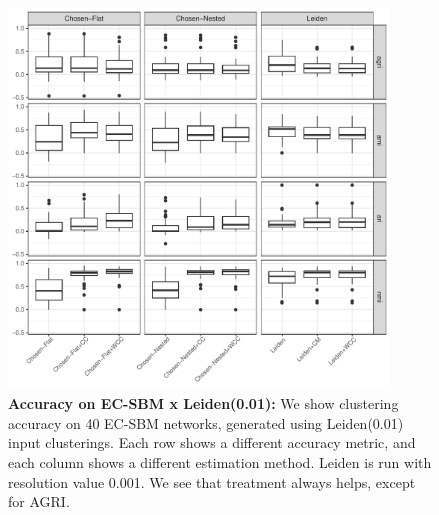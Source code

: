 \documentclass[aps,pre,superscriptaddress]{article}
\begin{document}
\begin{figure}[!htpb]
    \centering
    \includegraphics[width=0.9\textwidth]{figures/estimated_accuracy_leiden01.pdf}
    \caption[]{\textbf{Accuracy on EC-SBM x Leiden(0.01):} We show clustering accuracy on 40 EC-SBM networks, generated using Leiden(0.01) input clusterings. Each row shows a different accuracy metric, and each column shows a different estimation method. Leiden is run with resolution value 0.001. We see that treatment always helps, except for AGRI. }
\end{figure}
\end{document}
